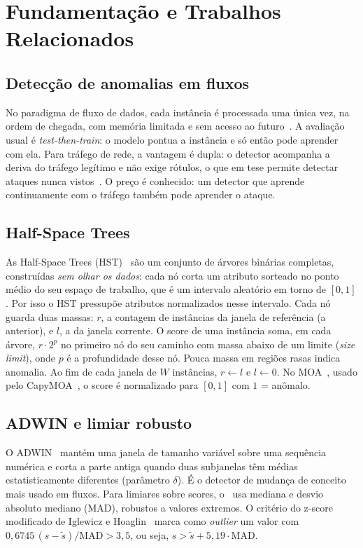 \section{Fundamentação e Trabalhos Relacionados}
\label{sec:background}

\subsection{Detecção de anomalias em fluxos}
No paradigma de fluxo de dados, cada instância é processada uma única vez, na ordem de chegada,
com memória limitada e sem acesso ao futuro~\cite{gama2014drift}. A avaliação usual é
\emph{test-then-train}: o modelo pontua a instância e só então pode aprender com ela. Para tráfego
de rede, a vantagem é dupla: o detector acompanha a deriva do tráfego legítimo e não exige rótulos,
o que em tese permite detectar ataques nunca vistos~\cite{mirsky2018kitsune}. O preço é conhecido:
um detector que aprende continuamente com o tráfego também pode aprender o ataque.

\subsection{Half-Space Trees}
As Half-Space Trees (HST)~\cite{tan2011hst} são um conjunto de árvores binárias completas,
construídas \emph{sem olhar os dados}: cada nó corta um atributo sorteado no ponto médio do seu
espaço de trabalho, que é um intervalo aleatório em torno de $[0,1]$. Por isso o HST pressupõe
atributos normalizados nesse intervalo. Cada nó guarda duas massas: $r$, a contagem de instâncias da
janela de referência (a anterior), e $l$, a da janela corrente. O score de uma instância soma, em
cada árvore, $r \cdot 2^{p}$ no primeiro nó do seu caminho com massa abaixo de um limite
(\emph{size limit}), onde $p$ é a profundidade desse nó. Pouca massa em regiões rasas indica
anomalia. Ao fim de cada janela de $W$ instâncias, $r \leftarrow l$ e $l \leftarrow 0$. No MOA~\cite{bifet2010moa},
usado pelo CapyMOA~\cite{gomes2025capymoa}, o score é normalizado para $[0,1]$ com $1$ = anômalo.

\subsection{ADWIN e limiar robusto}
O ADWIN~\cite{bifet2007adwin} mantém uma janela de tamanho variável sobre uma sequência numérica e
corta a parte antiga quando duas subjanelas têm médias estatisticamente diferentes (parâmetro
$\delta$). É o detector de mudança de conceito mais usado em fluxos. Para limiares sobre scores, o
\modus\ usa mediana e desvio absoluto mediano (MAD), robustos a valores extremos. O critério do
z-score modificado de Iglewicz e Hoaglin~\cite{iglewicz1993outliers} marca como \emph{outlier} um
valor com $0{,}6745\,(s-\tilde{s})/\mathrm{MAD} > 3{,}5$, ou seja, $s > \tilde{s} + 5{,}19\cdot\mathrm{MAD}$.

